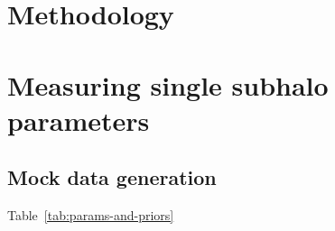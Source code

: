 \section{Methodology}

\section{Measuring single subhalo parameters} \label{sec:results-sub}

\subsection{Mock data generation}
\label{subsec:sub-data}

Table~\ref{tab:params-and-priors}
%
%


